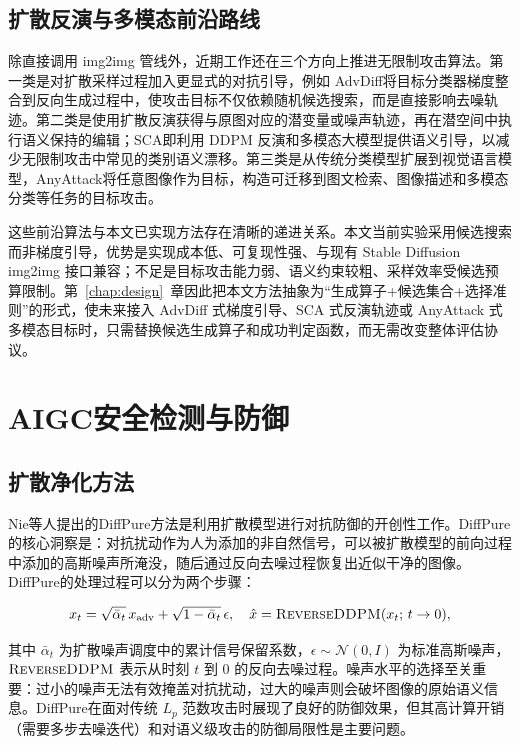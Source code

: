 \documentclass[type=bachelor,oneside]{fduthesis}
\begin{document}
\subsection{扩散反演与多模态前沿路线}

除直接调用 img2img 管线外，近期工作还在三个方向上推进无限制攻击算法。第一类是对扩散采样过程加入更显式的对抗引导，例如 AdvDiff\cite{dai2023advdiff}将目标分类器梯度整合到反向生成过程中，使攻击目标不仅依赖随机候选搜索，而是直接影响去噪轨迹。第二类是使用扩散反演获得与原图对应的潜变量或噪声轨迹，再在潜空间中执行语义保持的编辑；SCA\cite{pan2024sca}即利用 DDPM 反演和多模态大模型提供语义引导，以减少无限制攻击中常见的类别语义漂移。第三类是从传统分类模型扩展到视觉语言模型，AnyAttack\cite{zhang2024anyattack}将任意图像作为目标，构造可迁移到图文检索、图像描述和多模态分类等任务的目标攻击。

这些前沿算法与本文已实现方法存在清晰的递进关系。本文当前实验采用候选搜索而非梯度引导，优势是实现成本低、可复现性强、与现有 Stable Diffusion img2img 接口兼容；不足是目标攻击能力弱、语义约束较粗、采样效率受候选预算限制。第~\ref{chap:design}~章因此把本文方法抽象为“生成算子+候选集合+选择准则”的形式，使未来接入 AdvDiff 式梯度引导、SCA 式反演轨迹或 AnyAttack 式多模态目标时，只需替换候选生成算子和成功判定函数，而无需改变整体评估协议。

\section{AIGC安全检测与防御}
\label{sec:aigc_defense}

\subsection{扩散净化方法}

Nie等人\cite{nie2022diffpure}提出的DiffPure方法是利用扩散模型进行对抗防御的开创性工作。DiffPure的核心洞察是：对抗扰动作为人为添加的非自然信号，可以被扩散模型的前向过程中添加的高斯噪声所淹没，随后通过反向去噪过程恢复出近似干净的图像。DiffPure的处理过程可以分为两个步骤：

\begin{equation}
  x_t = \sqrt{\bar{\alpha}_t}\,x_{\text{adv}} + \sqrt{1-\bar{\alpha}_t}\,\epsilon,\quad
  \hat{x} = \textsc{ReverseDDPM}(x_t;\, t\to 0),
  \label{eq:diffpure}
\end{equation}

其中 $\bar{\alpha}_t$ 为扩散噪声调度中的累计信号保留系数，$\epsilon \sim \mathcal{N}(0, I)$ 为标准高斯噪声，$\textsc{ReverseDDPM}$ 表示从时刻 $t$ 到 0 的反向去噪过程。噪声水平的选择至关重要：过小的噪声无法有效掩盖对抗扰动，过大的噪声则会破坏图像的原始语义信息。DiffPure在面对传统 $L_p$ 范数攻击时展现了良好的防御效果，但其高计算开销（需要多步去噪迭代）和对语义级攻击的防御局限性是主要问题。
\end{document}
